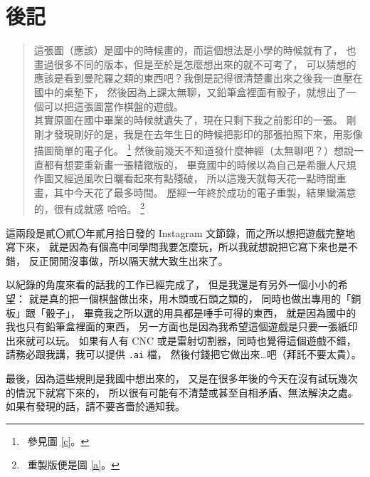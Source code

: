\documentclass[11pt,a4paper]{article}
\begin{document}
\section{後記} \label{SECTION_THREE} %

\begin{quote}
	這張圖（應該）是國中的時候畫的，而這個想法是小學的時候就有了，
	也畫過很多不同的版本，但是至於是怎麼想出來的就不可考了，
	可以猜想的應該是看到曼陀羅之類的東西吧？我倒是記得很清楚畫出來之後我一直壓在國中的桌墊下，
	然後因為上課太無聊，又鉛筆盒裡面有骰子，就想出了一個可以把這張圖當作棋盤的遊戲。
	\\\indent
	其實原圖在國中畢業的時候就遺失了，現在只剩下我之前影印的一張。
	剛剛才發現剛好的是，我是在去年生日的時候把影印的那張拍照下來，用影像描圖簡單的電子化。
		\footnote{\ 參見圖 \ref{c}。}
	然後前幾天不知道發什麼神經（太無聊吧？）想說一直都有想要重新畫一張精緻版的，
	畢竟國中的時候以為自己是希臘人尺規作圖又經過風吹日曬看起來有點殘破，
	所以這幾天就每天花一點時間重畫，其中今天花了最多時間。
	歷經一年終於成功的電子重製，結果蠻滿意的，很有成就感 哈哈。
		\footnote{\ 重製版便是圖 \ref{a}。}
\end{quote}

\noindent
這兩段是貳〇貳〇年貳月拾日發的 Instagram 文節錄，而之所以想把遊戲完整地寫下來，
就是因為有個高中同學問我要怎麼玩，所以我就想說把它寫下來也是不錯，
反正閒閒沒事做，所以隔天就大致生出來了。

以紀錄的角度來看的話我的工作已經完成了，
但是我還是有另外一個小小的希望：
就是真的把一個棋盤做出來，用木頭或石頭之類的，
同時也做出專用的「銅板」跟「骰子」，
畢竟我之所以選的用具都是唾手可得的東西，
就是因為國中的我也只有鉛筆盒裡面的東西，
另一方面也是因為我希望這個遊戲是只要一張紙印出來就可以玩。
如果有人有 CNC 或是雷射切割器，同時也覺得這個遊戲不錯，
請務必跟我講，我可以提供 \verb".ai" 檔，
然後付錢把它做出來…吧（拜託不要太貴）。

最後，因為這些規則是我國中想出來的，
又是在很多年後的今天在沒有試玩幾次的情況下就寫下來的，
所以很有可能有不清楚或甚至自相矛盾、無法解決之處。
如果有發現的話，請不要吝嗇於通知我。\\

\clearpage
\end{document}
